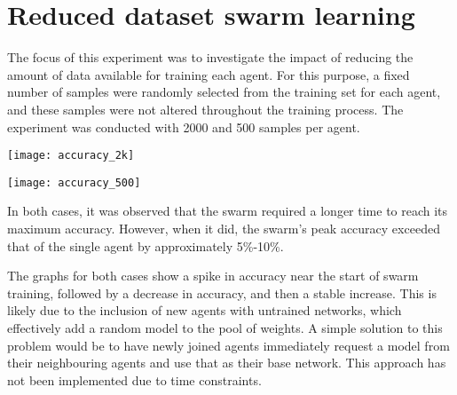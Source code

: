 \section{Reduced dataset swarm learning}
The focus of this experiment was to investigate the impact of reducing the amount of data available for training each agent. For this purpose, a fixed number of samples were randomly selected from the training set for each agent, and these samples were not altered throughout the training process. The experiment was conducted with 2000 and 500 samples per agent.

\texttt{[image: accuracy\_2k]}

\texttt{[image: accuracy\_500]}

In both cases, it was observed that the swarm required a longer time to reach its maximum accuracy. However, when it did, the swarm's peak accuracy exceeded that of the single agent by approximately 5\%-10\%.

The graphs for both cases show a spike in accuracy near the start of swarm training, followed by a decrease in accuracy, and then a stable increase. This is likely due to the inclusion of new agents with untrained networks, which effectively add a random model to the pool of weights. A simple solution to this problem would be to have newly joined agents immediately request a model from their neighbouring agents and use that as their base network. This approach has not been implemented due to time constraints.